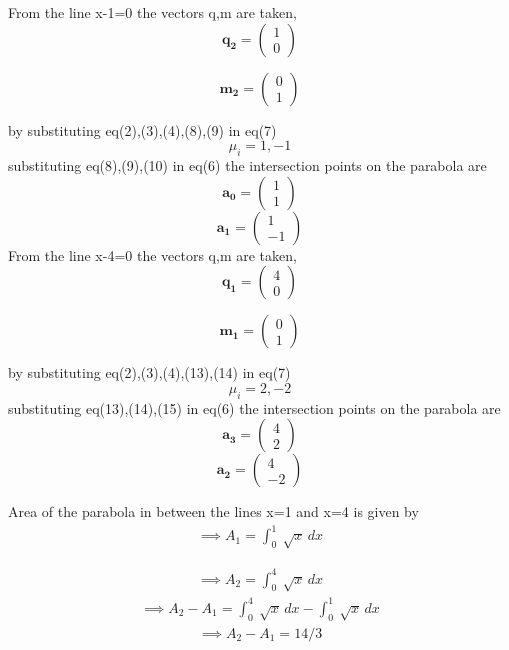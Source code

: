 \documentclass[journal,10pt,twocolumn]{article}
\let\vec\mathbf
\newcommand{\myvec}[1]{\ensuremath{\begin{pmatrix}#1\end{pmatrix}}}
\begin{document}
From the line x-1=0 the vectors q,m are taken,
\begin{equation}
\vec{q_2}=\myvec{1\\0}
\end{equation}

\begin{equation}
\vec{m_2}=\myvec{0\\1}
\end{equation}

by substituting eq(2),(3),(4),(8),(9) in eq(7)
\begin{equation}
\mu_i=1,-1
\end{equation}
substituting eq(8),(9),(10) in eq(6) the intersection points on the parabola are
\begin{equation}
\vec{a_0}=\myvec{1\\1}
\end{equation}
\begin{equation}
\vec{a_1}=\myvec{1\\-1}
\end{equation}
From the line x-4=0 the vectors q,m are taken,
\begin{equation}
\vec{q_1}=\myvec{4\\0}
\end{equation}

\begin{equation}
\vec{m_1}=\myvec{0\\1}
\end{equation}

by substituting eq(2),(3),(4),(13),(14) in eq(7)
\begin{equation}
\mu_i=2,-2
\end{equation}
substituting eq(13),(14),(15) in eq(6) the intersection points on the parabola are
\begin{equation}
\vec{a_3}=\myvec{4\\2}
\end{equation}
\begin{equation}
\vec{a_2}=\myvec{4\\-2}
\end{equation}

Area of the parabola in between the lines x=1 and x=4 is given by
\begin{align}
\implies A_1=\int_{0}^{1} \ \sqrt{x} \,dx
\end{align}

\begin{align}
\implies A_2=\int_{0}^{4} \ \sqrt{x} \,dx
\end{align}
\begin{align}
\implies A_2- A_1=\int_{0}^{4} \ \sqrt{x} \,dx-\int_{0}^{1} \ \sqrt{x} \,dx
\end{align}
\begin{align}
\implies A_2- A_1=14/3
\end{align}
\end{document}
